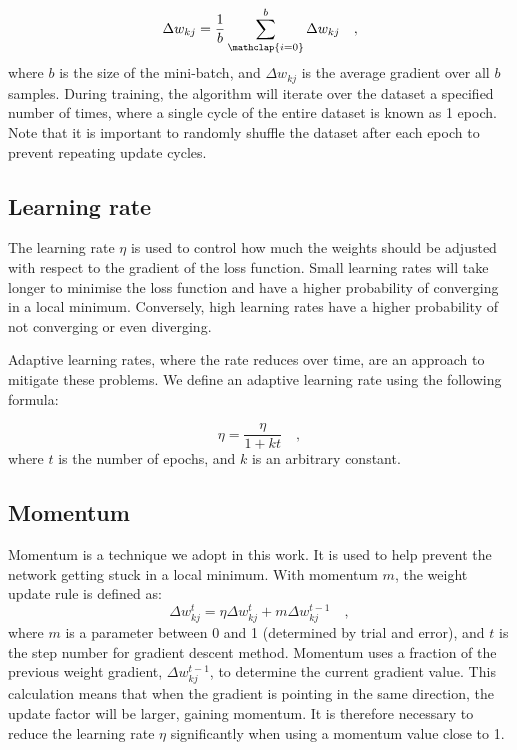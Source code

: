             \begin{equation} \label{eq:mini_batch}
               \Delta w_{kj} = \frac{ 1 } { b } \sum_{\mathclap{i=0}}^{b} \Delta w_{kj} \quad,
            \end{equation}
            where $b$ is the size of the mini-batch, and $\Delta w_{kj}$ is the average gradient over all $b$ samples. During training, the algorithm will iterate over the dataset a specified number of times, where a single cycle of the entire dataset is known as 1 epoch. Note that it is important to randomly shuffle the dataset after each epoch to prevent repeating update cycles.  
                

        \subsection{Learning rate} \label{learning_rate}
            The learning rate $\eta$ is used to control how much the weights should be adjusted with respect to the gradient of the loss function. Small learning rates will take longer to minimise the loss function and have a higher probability of converging in a local minimum. Conversely, high learning rates have a higher probability of not converging or even diverging. 
            
            Adaptive learning rates, where the rate reduces over time, are an approach to mitigate these problems. We define an adaptive learning rate using the following formula: 
            
            \begin{equation} \label{lr_adaptive}
                \eta = \frac{ \eta } { 1 + k t } \quad,
            \end{equation}
            where $t$ is the number of epochs, and $k$ is an arbitrary constant. 
        
        \subsection{Momentum} \label{momentum}
            Momentum is a technique we adopt in this work. It is used to help prevent the network getting stuck in a local minimum. With momentum $m$, the weight update rule is defined as: 
            \begin{equation} \label{SGD}
               \Delta w^{t}_{kj} = \eta \Delta w^{t}_{kj} + m \Delta w^{t-1}_{kj} \quad,
            \end{equation}
            where $m$ is a parameter between 0 and 1 (determined by trial and error), and $t$ is the step number for gradient descent method. Momentum uses a fraction of the previous weight gradient, $\Delta w^{t-1}_{kj}$, to determine the current gradient value. This calculation means that when the gradient is pointing in the same direction, the update factor will be larger, gaining momentum. It is therefore necessary to reduce the learning rate $\eta$ significantly when using a momentum value close to 1. 
            
